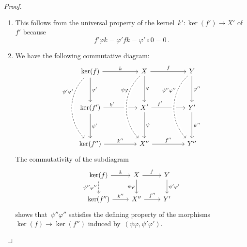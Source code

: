 \begin{proof}
  \leavevmode
  \begin{enumerate}
    \item
      This follows from the universal property of the kernel~$k' \colon \ker(f') \to X'$ of~$f'$ because
      \[
          f' \varphi k
        = \varphi' f k
        = \varphi' \circ 0
        = 0 \,.
      \]
    \item
    We have the following commutative diagram:
      \[
        \begin{tikzcd}[sep = huge]
            \ker(f)
            \arrow{r}[above]{k}
            \arrow{d}[right]{\varphi'}
          & X
            \arrow{r}[above]{f}
            \arrow{d}[right]{\varphi}
          & Y
            \arrow{d}[right]{\varphi''}
          \\
            \ker(f')
            \arrow{r}[above, near start]{k'}
            \arrow{d}[right]{\psi'}
          & X'
            \arrow{r}[above, near start]{f'}
            \arrow{d}[right]{\psi}
          & Y'
            \arrow{d}[right]{\psi''}
          \\
            \ker(f'')
            \arrow{r}[above]{k''}
            \arrow[from=uu, dashed, bend right = 45, crossing over, "\psi' \varphi'" left, near start]
          & X''
            \arrow{r}[above]{f''}
            \arrow[from=uu, dashed, bend right = 45, crossing over, "\psi \varphi" left, near start]
          & Y''
            \arrow[from=uu, dashed, bend right = 45, crossing over, "\psi'' \varphi''" left, near start]
        \end{tikzcd}
      \]
      The commutativity of the subdiagram
      \[
        \begin{tikzcd}
            \ker(f)
            \arrow{r}[above]{k}
            \arrow[dashed]{d}[left]{\psi'' \varphi''}
          & X
            \arrow{r}[above]{f}
            \arrow{d}[left]{\psi \varphi}
          & Y
            \arrow{d}[right]{\psi' \varphi'}
          \\
            \ker(f'')
            \arrow{r}[above]{k''}
          & X''
            \arrow{r}[above]{f''}
          & Y'
        \end{tikzcd}
      \]
      shows that~$\psi'' \varphi''$ satisfies the defining property of the morphisms~$\ker(f) \to \ker(f'')$ induced by~$(\psi \varphi, \psi' \varphi')$.
    \qedhere
  \end{enumerate}
\end{proof}

